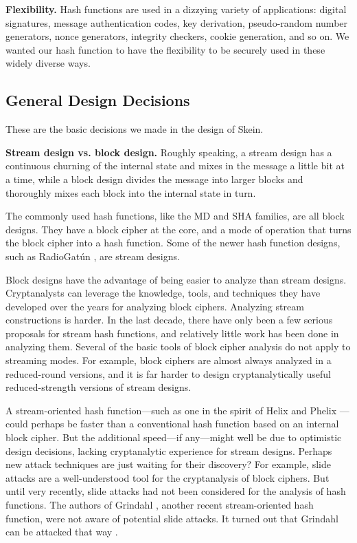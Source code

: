 \documentclass[11pt,twoside]{article}
\begin{document}
{\bf Flexibility.}  Hash functions are used in a dizzying variety of applications: digital signatures, message authentication codes, key derivation, pseudo-random number generators, nonce generators, integrity checkers, cookie generation, and so on.  We wanted our hash function to have the flexibility to be securely used in these widely diverse ways.

\subsection{General Design Decisions}

These are the basic decisions we made in the design of Skein.

{\bf Stream design vs. block design.} Roughly speaking, a stream design has a continuous churning of the internal state and mixes in the message a little bit at a time, while a block design divides the message into larger blocks and thoroughly mixes each block into the internal state in turn.

The commonly used hash functions, like the MD \cite{MD4, MD5} and SHA \cite{SHA, SHA-1, SHA-2} families, are all block designs.  They have a block cipher at the core, and a mode of operation that turns the block cipher into a hash function.  Some of the newer hash function designs, such as RadioGat\'{u}n \cite{Radiogatun}, are stream designs.

Block designs have the advantage of being easier to analyze than stream designs.  Cryptanalysts can leverage the knowledge, tools, and techniques they have developed over the years for analyzing block ciphers.  Analyzing stream constructions is harder. In the last decade, there have only been a few serious proposals for stream hash functions, and relatively little work has been done in analyzing them.  Several of the basic tools of block cipher analysis do not apply to streaming modes.  For example, block ciphers are almost always analyzed in a reduced-round versions, and it is far harder to design cryptanalytically useful reduced-strength versions of stream designs.

A stream-oriented hash function---such as one in the spirit of Helix \cite{Helix} and Phelix \cite{Phelix}---could perhaps be faster than a conventional hash function based on an internal block cipher. But the additional speed---if any---might well be due to optimistic design decisions, lacking cryptanalytic experience for stream designs. Perhaps new attack techniques are just waiting for their discovery? For example, slide attacks are a well-understood tool for the cryptanalysis of block ciphers. But until very recently, slide attacks had not been considered for the analysis of hash functions. The authors of Grindahl \cite{KRT07}, another  recent stream-oriented hash function, were not aware of potential slide attacks.  It turned out that Grindahl can be attacked that way \cite{GLP08}.
\end{document}
